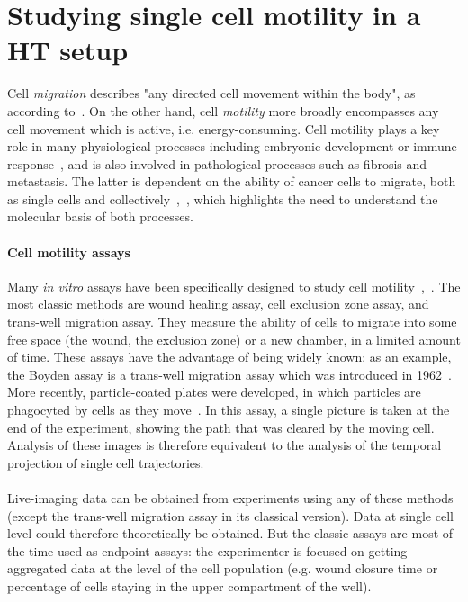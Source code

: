 \section{Studying single cell motility in a HT setup}

Cell \textit{migration} describes "any directed cell movement within the body", as according to~\cite{pmid22940039}. On the other hand, cell \textit{motility} more broadly encompasses any cell movement which is active, i.e. energy-consuming. Cell motility plays a key role in many physiological processes including embryonic development or immune response~\cite{pmid18711433}, and is also involved in pathological processes such as fibrosis and metastasis. The latter is dependent on the ability of cancer cells to migrate, both as single cells and collectively~\cite{pmid16888756},~\cite{pmid20460404}, which highlights the need to understand the molecular basis of both processes.

\paragraph*{Cell motility assays\\}
Many \textit{in vitro} assays have been specifically designed to study cell motility~\cite{pmid16888756},~\cite{pmid22940039}. The most classic methods are wound healing assay, cell exclusion zone assay, and trans-well migration assay. They measure the ability of cells to migrate into some free space (the wound, the exclusion zone) or a new chamber, in a limited amount of time. These assays have the advantage of being widely known; as an example, the Boyden assay is a trans-well migration assay which was introduced in 1962~\cite{pmid13872176}. More recently, particle-coated plates were developed, in which particles are phagocyted by cells as they move~\cite{pmid329998}.
In this assay, a single picture is taken at the end of the experiment,
showing the path that was cleared by the moving cell. Analysis of
these images is therefore equivalent to the analysis of the temporal
projection of single cell trajectories.  

\paragraph*{}
Live-imaging data can be obtained from experiments using any of these methods (except the trans-well migration assay in its classical version). Data at single cell level could therefore theoretically be obtained. But the classic assays are most of the time used as endpoint assays: the experimenter is focused on getting aggregated data at the level of the cell population (e.g. wound closure time or percentage of cells staying in the upper compartment of the well).

